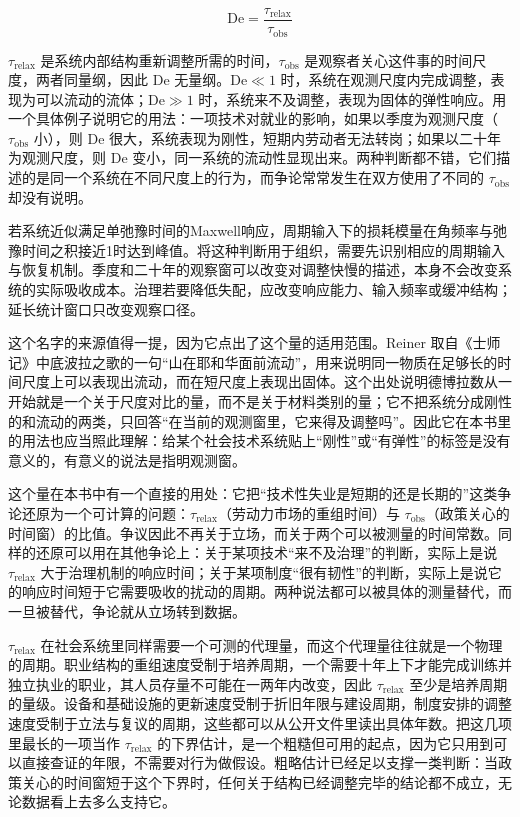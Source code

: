 \begin{equation}
\mathrm{De} = \frac{\tau_{\text{relax}}}{\tau_{\text{obs}}}
\end{equation}

$\tau_{\text{relax}}$ 是系统内部结构重新调整所需的时间，$\tau_{\text{obs}}$ 是观察者关心这件事的时间尺度，两者同量纲，因此 $\mathrm{De}$ 无量纲。$\mathrm{De} \ll 1$ 时，系统在观测尺度内完成调整，表现为可以流动的流体；$\mathrm{De} \gg 1$ 时，系统来不及调整，表现为固体的弹性响应。用一个具体例子说明它的用法：一项技术对就业的影响，如果以季度为观测尺度（$\tau_{\text{obs}}$ 小），则 $\mathrm{De}$ 很大，系统表现为刚性，短期内劳动者无法转岗；如果以二十年为观测尺度，则 $\mathrm{De}$ 变小，同一系统的流动性显现出来。两种判断都不错，它们描述的是同一个系统在不同尺度上的行为，而争论常常发生在双方使用了不同的 $\tau_{\text{obs}}$ 却没有说明。

若系统近似满足单弛豫时间的Maxwell响应，周期输入下的损耗模量在角频率与弛豫时间之积接近1时达到峰值。将这种判断用于组织，需要先识别相应的周期输入与恢复机制。季度和二十年的观察窗可以改变对调整快慢的描述，本身不会改变系统的实际吸收成本。治理若要降低失配，应改变响应能力、输入频率或缓冲结构；延长统计窗口只改变观察口径。

这个名字的来源值得一提，因为它点出了这个量的适用范围。Reiner 取自《士师记》中底波拉之歌的一句“山在耶和华面前流动”，用来说明同一物质在足够长的时间尺度上可以表现出流动，而在短尺度上表现出固体。这个出处说明德博拉数从一开始就是一个关于尺度对比的量，而不是关于材料类别的量；它不把系统分成刚性的和流动的两类，只回答“在当前的观测窗里，它来得及调整吗”。因此它在本书里的用法也应当照此理解：给某个社会技术系统贴上“刚性”或“有弹性”的标签是没有意义的，有意义的说法是指明观测窗。

这个量在本书中有一个直接的用处：它把“技术性失业是短期的还是长期的”这类争论还原为一个可计算的问题：$\tau_{\text{relax}}$（劳动力市场的重组时间）与 $\tau_{\text{obs}}$（政策关心的时间窗）的比值。争议因此不再关于立场，而关于两个可以被测量的时间常数。同样的还原可以用在其他争论上：关于某项技术“来不及治理”的判断，实际上是说 $\tau_{\text{relax}}$ 大于治理机制的响应时间；关于某项制度“很有韧性”的判断，实际上是说它的响应时间短于它需要吸收的扰动的周期。两种说法都可以被具体的测量替代，而一旦被替代，争论就从立场转到数据。

$\tau_{\text{relax}}$ 在社会系统里同样需要一个可测的代理量，而这个代理量往往就是一个物理的周期。职业结构的重组速度受制于培养周期，一个需要十年上下才能完成训练并独立执业的职业，其人员存量不可能在一两年内改变，因此 $\tau_{\text{relax}}$ 至少是培养周期的量级。设备和基础设施的更新速度受制于折旧年限与建设周期，制度安排的调整速度受制于立法与复议的周期，这些都可以从公开文件里读出具体年数。把这几项里最长的一项当作 $\tau_{\text{relax}}$ 的下界估计，是一个粗糙但可用的起点，因为它只用到可以直接查证的年限，不需要对行为做假设。粗略估计已经足以支撑一类判断：当政策关心的时间窗短于这个下界时，任何关于结构已经调整完毕的结论都不成立，无论数据看上去多么支持它。

